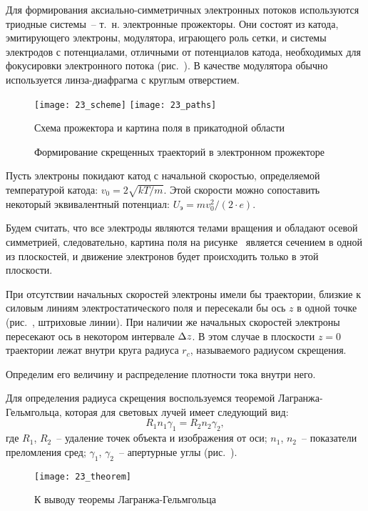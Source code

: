 
Для формирования аксиально-симметричных электронных потоков используются
триодные системы~-- т.~н. электронные прожекторы. Они состоят из катода,
эмитирующего электроны, модулятора, играющего роль сетки, и системы электродов с
потенциалами, отличными от потенциалов катода, необходимых для фокусировки
электронного потока (рис.~). В качестве модулятора обычно
используется линза-диафрагма с круглым отверстием.
\begin{figure}[h!]
  \center
  \texttt{[image: 23\_scheme]} \hspace{1em}
  \texttt{[image: 23\_paths]} \\
  \parbox{.3\textwidth}{\caption{Схема прожектора и картина поля в прикатодной
    области} \label{pic23scheme}} \hspace{1em}
  \parbox{.5\textwidth}{\caption{Формирование скрещенных траекторий в
    электронном прожекторе} \label{pic23paths}}
\end{figure}

Пусть электроны покидают катод с начальной скоростью, определяемой температурой
катода: \( v_0 = 2\sqrt{kT / m} \). Этой скорости можно сопоставить некоторый
эквивалентный потенциал: \( U_\text{э} = mv_0^2 / (2 \cdot e) \).

Будем считать, что все электроды являются телами вращения и обладают осевой
симметрией, следовательно, картина поля на рисунке~ является
сечением в одной из плоскостей, и движение электронов будет происходить только
в этой плоскости.

При отсутствии начальных скоростей электроны имели бы траектории, близкие к
силовым линиям электростатического поля и пересекали бы ось \( z \) в одной
точке (рис.~, штриховые линии). При наличии же начальных скоростей
электроны пересекают ось в некотором интервале \( \Delta z \). В этом случае в
плоскости \( z = 0 \) траектории лежат внутри круга радиуса \( r_c \),
называемого радиусом скрещения.

Определим его величину и распределение плотности тока внутри него.

Для определения радиуса скрещения воспользуемся теоремой Лагранжа-Гельмгольца,
которая для световых лучей имеет следующий вид:
\begin{equation}
  R_1 n_1 \gamma_1 = R_2 n_2 \gamma_2,
  \label{eq23optic}
\end{equation}
где \( R_1 \), \( R_2 \)~-- удаление точек объекта и изображения от оси;
\( n_1 \), \( n_2 \)~-- показатели преломления сред; \( \gamma_1 \),
\( \gamma_2 \)~-- апертурные углы (рис.~).
\begin{figure}[hb!]
  \center
  \texttt{[image: 23\_theorem]}
  \caption{К выводу теоремы Лагранжа-Гельмгольца}
  \label{pic23theorem}
\end{figure}

